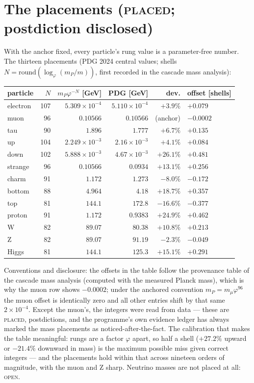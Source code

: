 \documentclass[12pt]{article}
\theoremstyle{definition}
\theoremstyle{remark}
\begin{document}
\section{The placements (\textsc{placed}; postdiction disclosed)}\label{sec:placements}

With the anchor fixed, every particle's rung value is a parameter-free number. The thirteen placements (PDG 2024 central values; shells $N = \mathrm{round}(\log_\varphi(m_P/m))$, first recorded in the cascade mass analysis):

\begin{center}
\begin{tabular}{lrrrrl}
\toprule
particle & $N$ & $m_P\varphi^{-N}$ [GeV] & PDG [GeV] & dev. & offset [shells] \\
\midrule
electron & 107 & $5.309\times10^{-4}$ & $5.110\times10^{-4}$ & $+3.9\%$ & $+0.079$ \\
muon & 96 & $0.10566$ & $0.10566$ & (anchor) & $-0.0002$ \\
tau & 90 & $1.896$ & $1.777$ & $+6.7\%$ & $+0.135$ \\
up & 104 & $2.249\times10^{-3}$ & $2.16\times10^{-3}$ & $+4.1\%$ & $+0.084$ \\
down & 102 & $5.888\times10^{-3}$ & $4.67\times10^{-3}$ & $+26.1\%$ & $+0.481$ \\
strange & 96 & $0.10566$ & $0.0934$ & $+13.1\%$ & $+0.256$ \\
charm & 91 & $1.172$ & $1.273$ & $-8.0\%$ & $-0.172$ \\
bottom & 88 & $4.964$ & $4.18$ & $+18.7\%$ & $+0.357$ \\
top & 81 & $144.1$ & $172.8$ & $-16.6\%$ & $-0.377$ \\
proton & 91 & $1.172$ & $0.9383$ & $+24.9\%$ & $+0.462$ \\
W & 82 & $89.07$ & $80.38$ & $+10.8\%$ & $+0.213$ \\
Z & 82 & $89.07$ & $91.19$ & $-2.3\%$ & $-0.049$ \\
Higgs & 81 & $144.1$ & $125.3$ & $+15.1\%$ & $+0.291$ \\
\bottomrule
\end{tabular}
\end{center}

Conventions and disclosure: the offsets in the table follow the provenance table of the cascade mass analysis (computed with the measured Planck mass), which is why the muon row shows $-0.0002$; under the anchored convention $m_P = m_\mu\varphi^{96}$ the muon offset is identically zero and all other entries shift by that same $2\times10^{-4}$. Except the muon's, the integers were read from data --- these are \textsc{placed}, postdictions, and the programme's own evidence ledger has always marked the mass placements as noticed-after-the-fact. The calibration that makes the table meaningful: rungs are a factor $\varphi$ apart, so half a shell ($+27.2\%$ upward or $-21.4\%$ downward in mass) is the maximum possible miss given correct integers --- and the placements hold within that across nineteen orders of magnitude, with the muon and Z sharp. Neutrino masses are not placed at all: \textsc{open}.
\end{document}
